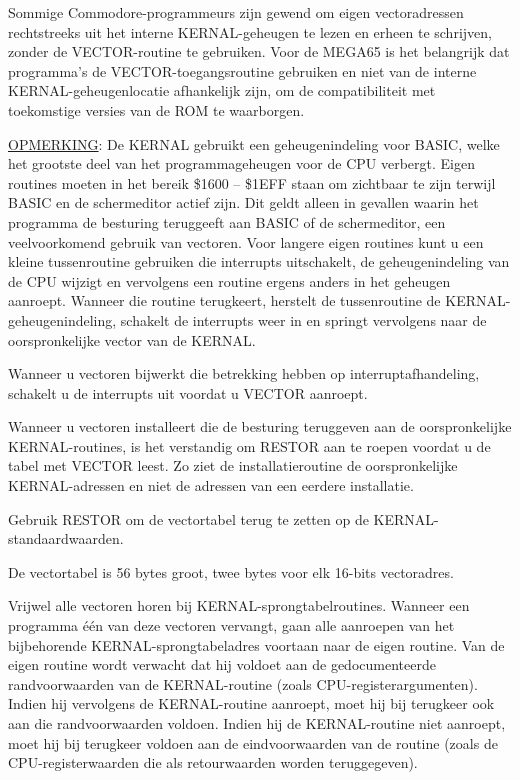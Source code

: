 \begin{description}[leftmargin=2cm,style=nextline]
        Sommige Commodore-programmeurs zijn gewend om eigen vectoradressen rechtstreeks uit het interne KERNAL-geheugen te lezen en erheen te schrijven, zonder de VECTOR-routine te gebruiken. Voor de MEGA65 is het belangrijk dat programma's de VECTOR-toegangsroutine gebruiken en niet van de interne KERNAL-geheugenlocatie afhankelijk zijn, om de compatibiliteit met toekomstige versies van de ROM te waarborgen.

        \underline{OPMERKING}: De KERNAL gebruikt een geheugenindeling voor BASIC, welke het grootste deel van het programmageheugen voor de CPU verbergt. Eigen routines moeten in het bereik \$1600 -- \$1EFF staan om zichtbaar te zijn terwijl BASIC en de schermeditor actief zijn. Dit geldt alleen in gevallen waarin het programma de besturing teruggeeft aan BASIC of de schermeditor, een veelvoorkomend gebruik van vectoren. Voor langere eigen routines kunt u een kleine tussenroutine gebruiken die interrupts uitschakelt, de geheugenindeling van de CPU wijzigt en vervolgens een routine ergens anders in het geheugen aanroept. Wanneer die routine terugkeert, herstelt de tussenroutine de KERNAL-geheugenindeling, schakelt de interrupts weer in en springt vervolgens naar de oorspronkelijke vector van de KERNAL.

        Wanneer u vectoren bijwerkt die betrekking hebben op interruptafhandeling, schakelt u de interrupts uit voordat u VECTOR aanroept.

        Wanneer u vectoren installeert die de besturing teruggeven aan de oorspronkelijke KERNAL-routines, is het verstandig om RESTOR aan te roepen voordat u de tabel met VECTOR leest. Zo ziet de installatieroutine de oorspronkelijke KERNAL-adressen en niet de adressen van een eerdere installatie.

        Gebruik RESTOR om de vectortabel terug te zetten op de KERNAL-standaardwaarden.

    \item [Vectortabel:]        De vectortabel is 56 bytes groot, twee bytes voor elk 16-bits vectoradres.

        Vrijwel alle vectoren horen bij KERNAL-sprongtabelroutines. Wanneer een programma één van deze vectoren vervangt, gaan alle aanroepen van het bijbehorende KERNAL-sprongtabeladres voortaan naar de eigen routine. Van de eigen routine wordt verwacht dat hij voldoet aan de gedocumenteerde randvoorwaarden van de KERNAL-routine (zoals CPU-registerargumenten). Indien hij vervolgens de KERNAL-routine aanroept, moet hij bij terugkeer ook aan die randvoorwaarden voldoen. Indien hij de KERNAL-routine niet aanroept, moet hij bij terugkeer voldoen aan de eindvoorwaarden van de routine (zoals de CPU-registerwaarden die als retourwaarden worden teruggegeven).


\end{description}
